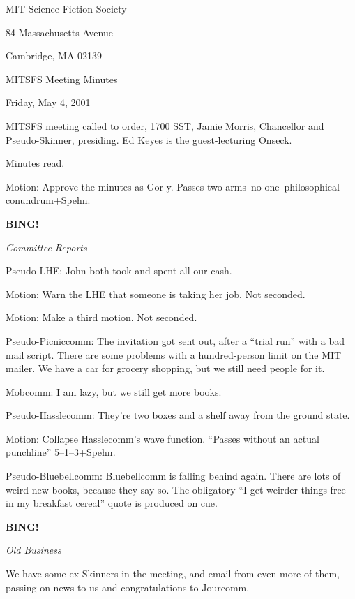 \documentclass[12pt]{article}
\newcommand{\bing}{{\bf BING!} }
\newcommand{\goto}[1]{\bing \vskip 12pt \centerline{{\em{#1}}}}
\begin{document}
\begin{center}

MIT Science Fiction Society 

84 Massachusetts Avenue

Cambridge, MA 02139

\vspace{12pt}

MITSFS Meeting Minutes 

Friday, May 4, 2001

\end{center}
 
\vspace{18pt}

\setlength{\parskip}{6pt}

\noindent
MITSFS meeting called to order, 1700 SST, Jamie Morris, Chancellor and
Pseudo-Skinner, presiding.  Ed Keyes is the guest-lecturing Onseck.

Minutes read.

Motion: Approve the minutes as Gor-y.  Passes two arms--no 
one--philosophical conundrum+Spehn.

\goto{Committee Reports}

Pseudo-LHE: John both took and spent all our cash.

Motion: Warn the LHE that someone is taking her job.  Not seconded.

Motion: Make a third motion.  Not seconded.

Pseudo-Picniccomm: The invitation got sent out, after a ``trial run''
with a bad mail script.  There are some problems with a hundred-person
limit on the MIT mailer.  We have a car for grocery shopping, but we
still need people for it.

Mobcomm: I am lazy, but we still get more books.

Pseudo-Hasslecomm: They're two boxes and a shelf away from the
ground state.

Motion: Collapse Hasslecomm's wave function.  ``Passes without an
actual punchline'' 5--1--3+Spehn.

Pseudo-Bluebellcomm: Bluebellcomm is falling behind again.  There
are lots of weird new books, because they say so.  The obligatory
``I get weirder things free in my breakfast cereal'' quote is
produced on cue.

\goto{Old Business}

We have some ex-Skinners in the meeting, and email from even more
of them, passing on news to us and congratulations to Jourcomm.
\end{document}
